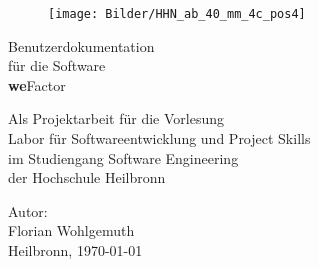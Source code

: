 %
%

\thispagestyle{empty}

\begin{figure}
\flushright						%
\texttt{[image: Bilder/HHN\_ab\_40\_mm\_4c\_pos4]}\\
\end{figure}

\vspace*{1.0cm}

\begin{center}
{\Huge Benutzerdokumentation\\
\vspace{0.1cm} 
für die Software\\
\vspace{0.1cm} 
\textbf{we}Factor}

\vspace{3.0cm}

	{\Large Als Projektarbeit für die Vorlesung\\
\vspace{0.1cm}
	Labor für Softwareentwicklung und Project Skills\\
\vspace{0.1cm}
	im Studiengang Software Engineering\\
\vspace{0.1cm}
	der Hochschule Heilbronn\\

}
\end{center}

\vspace*{4.5cm}





Autor:\\
{\Large
Florian Wohlgemuth\\

 }
\vspace{1,5cm}
Heilbronn, \today
